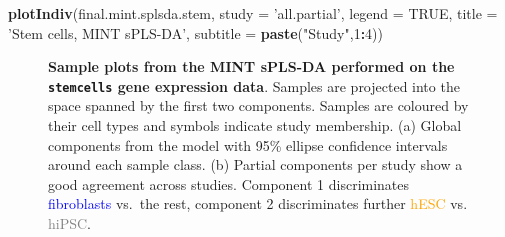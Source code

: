 \documentclass[]{book}
\newenvironment{Shaded}{\begin{snugshade}}{\end{snugshade}}
\newcommand{\KeywordTok}[1]{\textcolor[rgb]{0.13,0.29,0.53}{\textbf{#1}}}
\newcommand{\DataTypeTok}[1]{\textcolor[rgb]{0.13,0.29,0.53}{#1}}
\newcommand{\DecValTok}[1]{\textcolor[rgb]{0.00,0.00,0.81}{#1}}
\newcommand{\StringTok}[1]{\textcolor[rgb]{0.31,0.60,0.02}{#1}}
\newcommand{\OtherTok}[1]{\textcolor[rgb]{0.56,0.35,0.01}{#1}}
\newcommand{\OperatorTok}[1]{\textcolor[rgb]{0.81,0.36,0.00}{\textbf{#1}}}
\newcommand{\NormalTok}[1]{#1}
\begin{document}
\begin{Shaded}
\begin{Highlighting}[]
\KeywordTok{plotIndiv}\NormalTok{(final.mint.splsda.stem, }\DataTypeTok{study =} \StringTok{'all.partial'}\NormalTok{, }\DataTypeTok{legend =} \OtherTok{TRUE}\NormalTok{, }
          \DataTypeTok{title =} \StringTok{'Stem cells, MINT sPLS-DA'}\NormalTok{, }
          \DataTypeTok{subtitle =} \KeywordTok{paste}\NormalTok{(}\StringTok{"Study"}\NormalTok{,}\DecValTok{1}\OperatorTok{:}\DecValTok{4}\NormalTok{))}
\end{Highlighting}
\end{Shaded}

\begin{figure}

{\centering {}

}

\caption{\textbf{Sample plots from the MINT sPLS-DA performed on
the \texttt{stemcells} gene expression data}. Samples are projected into
the space spanned by the first two components. Samples are coloured by
their cell types and symbols indicate study membership. (a) Global
components from the model with 95\% ellipse confidence intervals around
each sample class. (b) Partial components per study show a good
agreement across studies. Component 1 discriminates
\textcolor{blue}{fibroblasts} vs.~the rest, component 2 discriminates
further \textcolor{orange}{hESC} vs. \textcolor{grey}{hiPSC}.}\label{fig:MINT-indiv}
\end{figure}
\end{document}
